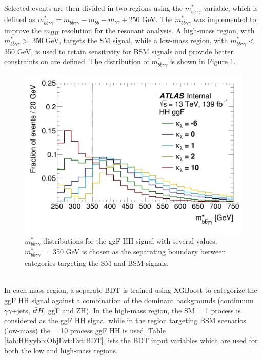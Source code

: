 Selected events are then divided in two regions using the $m_{b\bar{b}\gamma\gamma}^*$ variable, which is defined as  $m_{b\bar{b}\gamma\gamma}^* = m_{b\bar{b}\gamma\gamma} - m_{\bar{b}b} - m_{\gamma\gamma} + 250$ GeV. The $m_{b\bar{b}\gamma\gamma}^*$ was implemented to improve the $m_{HH}$ resolution for the resonant analysis. A high-mass region, with $m_{b\bar{b}\gamma\gamma}^* > $ 350 GeV, targets the SM signal, while a low-mass region, with $m_{b\bar{b}\gamma\gamma}^* < $ 350 GeV, is used to retain sensitivity for BSM signals and provide better constraints on \kl are defined. The distribution of $m_{b\bar{b}\gamma\gamma}^*$ is shown in Figure \ref{fig:HHyybb:ObjEvt:Evt:myybb}.  
\begin{figure}[htbp]
    \centering
	\includegraphics[width=.6\textwidth]{Ch5/Img/yybbstar_ggF.png} 
    \caption{$m_{b\bar{b}\gamma\gamma}^*$ distributions for the ggF HH signal with several \kl values. $m_{b\bar{b}\gamma\gamma}^* = $ 350 GeV is chosen as the separating boundary between categories targeting the SM and BSM \kl signals.}
    \label{fig:HHyybb:ObjEvt:Evt:myybb}
\end{figure}
\\
In each mass region, a separate BDT is trained using XGBoost \cite{XGBoost} to categorize the ggF HH signal against a combination of the dominant backgrounds (continuum $\gamma\gamma$+jets, $t\bar{t}H$, ggF and ZH). In the high-mass region, the SM \kl= 1 process is considered as the ggF HH signal while in the region targeting BSM scenarios (low-mass) the \kl= 10 process ggF HH is used. Table \ref{tab:HHyybb:ObjEvt:Evt:BDT} lists the BDT input variables which are used for both the low and high-mass regions.
